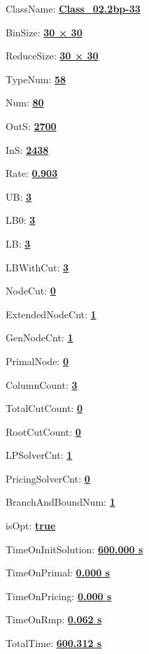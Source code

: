 \documentclass[11pt]{article}
\begin{document}
\pagestyle{empty}


ClassName: \underline{\textbf{Class_02.2bp-33}}
\par
BinSize: \underline{\textbf{30 × 30}}
\par
ReduceSize: \underline{\textbf{30 × 30}}
\par
TypeNum: \underline{\textbf{58}}
\par
Num: \underline{\textbf{80}}
\par
OutS: \underline{\textbf{2700}}
\par
InS: \underline{\textbf{2438}}
\par
Rate: \underline{\textbf{0.903}}
\par
UB: \underline{\textbf{3}}
\par
LB0: \underline{\textbf{3}}
\par
LB: \underline{\textbf{3}}
\par
LBWithCut: \underline{\textbf{3}}
\par
NodeCut: \underline{\textbf{0}}
\par
ExtendedNodeCnt: \underline{\textbf{1}}
\par
GenNodeCnt: \underline{\textbf{1}}
\par
PrimalNode: \underline{\textbf{0}}
\par
ColumnCount: \underline{\textbf{3}}
\par
TotalCutCount: \underline{\textbf{0}}
\par
RootCutCount: \underline{\textbf{0}}
\par
LPSolverCnt: \underline{\textbf{1}}
\par
PricingSolverCnt: \underline{\textbf{0}}
\par
BranchAndBoundNum: \underline{\textbf{1}}
\par
isOpt: \underline{\textbf{true}}
\par
TimeOnInitSolution: \underline{\textbf{600.000 s}}
\par
TimeOnPrimal: \underline{\textbf{0.000 s}}
\par
TimeOnPricing: \underline{\textbf{0.000 s}}
\par
TimeOnRmp: \underline{\textbf{0.062 s}}
\par
TotalTime: \underline{\textbf{600.312 s}}
\par
\newpage
\end{document}
